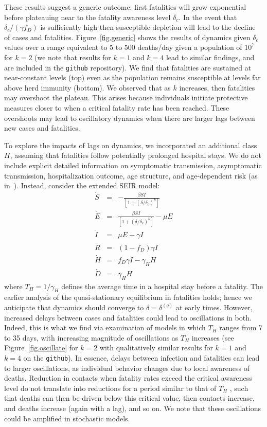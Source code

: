 These results suggest a generic outcome: first fatalities will grow
exponential before plateauing near to the fatality awareness level $\delta_c$.
In the event that $\delta_c/(\gamma f_D)$ is sufficiently high then susceptible
depletion will lead to the decline of cases and fatalities.
Figure~\ref{fig.generic} shows
the results of dynamics given $\delta_c$ values over a range 
equivalent to 5 to 500 deaths/day given a population of $10^7$
for $k=2$ (we note that results for $k=1$ and $k=4$ lead to similar
findings, and are included in the \verb|github| repository).
We find that fatalities are sustained at near-constant levels (top)
even as the population remains susceptible at levels far above herd immunity (bottom).
We observed that as $k$ increases, then fatalities may overshoot
the plateau. This arises because individuals initiate protective measures
closer to when a critical fatality rate has been reached.
These overshoots may lead to oscillatory dynamics
when there are larger lags between new cases and fatalities.

To explore the impacts of lags on dynamics,
we incorporated an additional class $H$,
assuming that fatalities follow potentially prolonged
hospital stays.  We do not include explicit
detailed information on symptomatic transmission, asymptomatic
transmission, hospitalization outcome,
age structure, and age-dependent risk (as in~\citep{ferguson2020report}). 
Instead, consider the extended SEIR model:
\begin{eqnarray}
\dot{S} &=& -\frac{\beta SI}{\left[1+\left(\delta/\delta_c\right)^{k}\right]}\\
\dot{E} &=& \frac{\beta SI}{\left[1+\left(\delta/\delta_c\right)^{k}\right]}-\mu E\\
\dot{I} &=& \mu E-\gamma I \\
\dot{R} &=& (1-f_D)\gamma I\\
\dot{H} &=& f_D\gamma I - \gamma_H H\\
\dot{D} &=& \gamma_H H
\end{eqnarray}
where $T_H=1/\gamma_H$ defines the average time in a hospital
stay before a fatality. The earlier analysis of
the quasi-stationary equilibrium in fatalities holds; hence
we anticipate that dynamics should converge to $\delta=\delta^{(q)}$
at early times. However, increased delays between cases and
fatalities could lead to oscillations in both.  Indeed, this
is what we find via examination of models in which
$T_H$ ranges from 7 to 35 days, with increasing magnitude of
oscillations as $T_H$ increases (see Figure~\ref{fig.oscillate} 
for $k=2$ with qualitatively similar results for $k=1$ and
$k=4$ on the \verb|github|).
In essence, delays between infection and fatalities can lead to larger oscillations,
as individual behavior changes due to local awareness of deaths.  Reduction in 
contacts when fatality rates exceed the critical awareness level do not translate
into reductions for a period similar to that of $T_H$ , such that deaths can then be driven
below this critical value, then contacts increase, and deaths increase (again with
a lag), and so on.  
We note that these oscillations could be amplified 
in stochastic models.  

